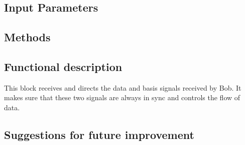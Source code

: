 
\subsection*{Input Parameters}

\subsection*{Methods}

\subsection*{Functional description}
This block receives and directs the data and basis signals received by Bob. It
makes sure that these two signals are always in sync and controls the flow of data.

\subsection*{Suggestions for future improvement}